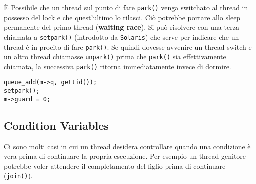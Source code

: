 \documentclass[12pt, twoside, letterpaper]{article}
\begin{document}
				È Possibile che un thread sul punto di fare \texttt{park()}	venga switchato al thread in possesso del lock e che quest'ultimo lo rilasci. Ciò potrebbe portare allo sleep permanente del primo thread (\textbf{waiting race}). Si può risolvere con una terza chiamata a \texttt{setpark()} (introdotto da \texttt{Solaris}) che serve per indicare che un thread è in procito di fare \texttt{park()}. Se quindi dovesse avvenire un thread switch e un altro thread chiamasse \texttt{unpark()} prima che \texttt{park()} sia effettivamente chiamata, la successiva \texttt{park()} ritorna immediatamente invece di dormire.
				
				\begin{lstlisting}[style=CStyle]
queue_add(m->q, gettid());
setpark();
m->guard = 0;	\end{lstlisting} 
		
		\subsection{Condition Variables}
			Ci sono molti casi in cui un thread desidera controllare quando una condizione è vera prima di continuare la propria esecuzione. Per esempio un thread genitore potrebbe voler attendere il completamento del figlio prima di continuare (\texttt{join()}).
			
\end{document}

